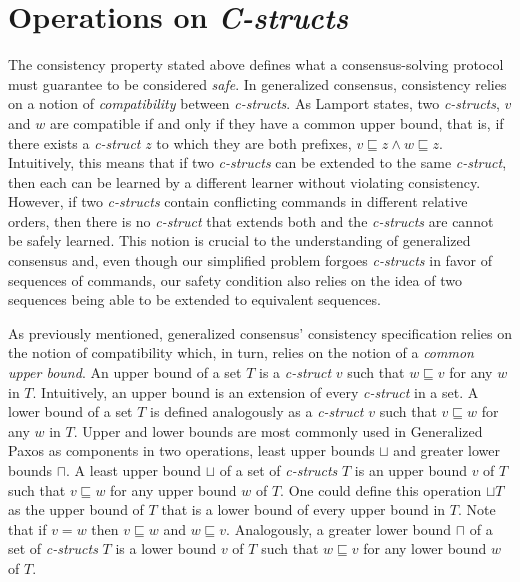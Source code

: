\section{Operations on \textit{C-structs}} \label{Operations}
The consistency property stated above defines what a consensus-solving protocol must guarantee to be considered \textit{safe}. In generalized consensus, consistency relies on a notion of \textit{compatibility} between \textit{c-structs}. As Lamport states, two \textit{c-structs}, $v$ and $w$ are compatible if and only if they have a common upper bound, that is, if there exists a \textit{c-struct} $z$ to which they are both prefixes, $v \sqsubseteq z \land w \sqsubseteq z$. Intuitively, this means that if two \textit{c-structs} can be extended to the same \textit{c-struct}, then each can be learned by a different learner without violating consistency. However, if two \textit{c-structs} contain conflicting commands in different relative orders, then there is no \textit{c-struct} that extends both and the \textit{c-structs} are cannot be safely learned. This notion is crucial to the understanding of generalized consensus and, even though our simplified problem forgoes \textit{c-structs} in favor of sequences of commands, our safety condition also relies on the idea of two sequences being able to be extended to equivalent sequences.\par
As previously mentioned, generalized consensus' consistency specification relies on the notion of compatibility which, in turn, relies on the notion of a \textit{common upper bound}. An upper bound of a set $T$ is a \textit{c-struct} $v$ such that $w \sqsubseteq v$ for any $w$ in $T$. Intuitively, an upper bound is an extension of every \textit{c-struct} in a set. A lower bound of a set $T$ is defined analogously as a \textit{c-struct} $v$ such that $v \sqsubseteq w$ for any $w$ in $T$. Upper and lower bounds are most commonly used in Generalized Paxos as components in two operations, least upper bounds $\sqcup$ and greater lower bounds $\sqcap$. A least upper bound $\sqcup$ of a set of \textit{c-structs} $T$ is an upper bound $v$ of $T$ such that $v \sqsubseteq w$ for any upper bound $w$ of $T$. One could define this operation $\sqcup T$ as the upper bound of $T$ that is a lower bound of every upper bound in $T$. Note that if $v = w$ then $v\sqsubseteq w$ and $w\sqsubseteq v$. Analogously, a greater lower bound $\sqcap$ of a set of \textit{c-structs} $T$ is a lower bound $v$ of $T$ such that $w \sqsubseteq v$ for any lower bound $w$ of $T$. \par
